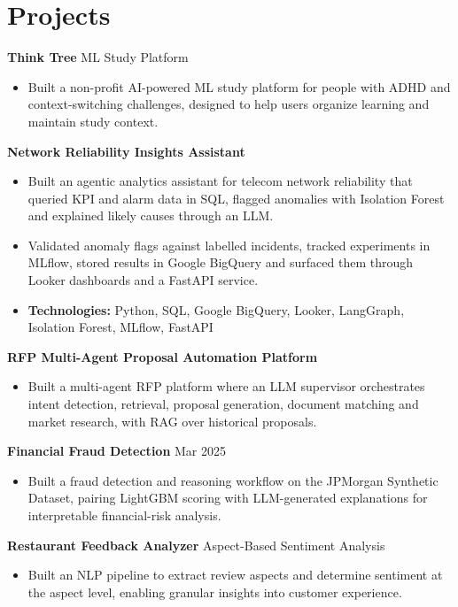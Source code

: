 \documentclass[10pt,a4paper]{article}
\begin{document}
\section{Projects}
\textbf{Think Tree} \textbar{} ML Study Platform\par
\begin{itemize}
  \item Built a non-profit AI-powered ML study platform for people with ADHD and context-switching challenges, designed to help users organize learning and maintain study context.
\end{itemize}
\textbf{Network Reliability Insights Assistant}\par
\begin{itemize}
  \item Built an agentic analytics assistant for telecom network reliability that queried KPI and alarm data in SQL, flagged anomalies with Isolation Forest and explained likely causes through an LLM.
  \item Validated anomaly flags against labelled incidents, tracked experiments in MLflow, stored results in Google BigQuery and surfaced them through Looker dashboards and a FastAPI service.
  \item \textbf{Technologies:} Python, SQL, Google BigQuery, Looker, LangGraph, Isolation Forest, MLflow, FastAPI
\end{itemize}
\textbf{RFP Multi-Agent Proposal Automation Platform}\par
\begin{itemize}
  \item Built a multi-agent RFP platform where an LLM supervisor orchestrates intent detection, retrieval, proposal generation, document matching and market research, with RAG over historical proposals.
\end{itemize}
\textbf{Financial Fraud Detection} \textbar{} Mar 2025\par
\begin{itemize}
  \item Built a fraud detection and reasoning workflow on the JPMorgan Synthetic Dataset, pairing LightGBM scoring with LLM-generated explanations for interpretable financial-risk analysis.
\end{itemize}
\textbf{Restaurant Feedback Analyzer} \textbar{} Aspect-Based Sentiment Analysis\par
\begin{itemize}
  \item Built an NLP pipeline to extract review aspects and determine sentiment at the aspect level, enabling granular insights into customer experience.
\end{itemize}
\end{document}
